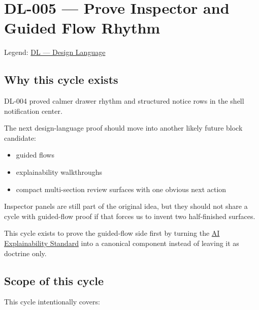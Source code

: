 \chapter{DL-005 --- Prove Inspector and Guided Flow Rhythm}\label{record-172}

\smallskip

Legend: \href{https://github.com/flyingrobots/bijou/blob/1853ad902f6bf219326409e7f743a5a1d6517dbc/docs/legends/DL-design-language.md}{DL --- Design Language}

\section{Why this cycle exists}\label{record-172-why-this-cycle-exists}

DL-004 proved calmer drawer rhythm and structured notice rows in the shell notification center.

The next design-language proof should move into another likely future block candidate:

\begin{itemize}
\tightlist
\item
  guided flows
\item
  explainability walkthroughs
\item
  compact multi-section review surfaces with one obvious next action
\end{itemize}

Inspector panels are still part of the original idea, but they should not share a cycle with guided-flow proof if that forces us to invent two half-finished surfaces.

This cycle exists to prove the guided-flow side first by turning the \href{https://github.com/flyingrobots/bijou/blob/cbd70612140e7a450d764b3c7be1c6af878b99bc/docs/strategy/ai-explainability-standard.md}{AI Explainability Standard} into a canonical component instead of leaving it as doctrine only.

\section{Scope of this cycle}\label{record-172-scope-of-this-cycle}

This cycle intentionally covers:

